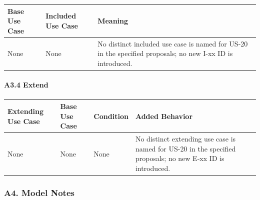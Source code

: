 \documentclass[12pt]{article}
\renewcommand{\baselinestretch}{1.5}
\begin{document}
\begingroup
\small
\renewcommand{\baselinestretch}{1.0}\selectfont
\renewcommand{\arraystretch}{1.15}
\setlength{\tabcolsep}{6pt}
\begin{longtable}{|>{\raggedright\arraybackslash}p{}|>{\raggedright\arraybackslash}p{}|>{\raggedright\arraybackslash}p{}|}
\hline
\textbf{Base Use Case} & \textbf{Included Use Case} & \textbf{Meaning} \\ \hline
\endhead
None & None & No distinct included use case is named for US-20 in the specified proposals; no new I-xx ID is introduced. \\ \hline
\end{longtable}
\endgroup
\par\medskip

\hypertarget{sec:a3-4-extend}{}
\paragraph*{A3.4 Extend}
\par\medskip

\begingroup
\small
\renewcommand{\baselinestretch}{1.0}\selectfont
\renewcommand{\arraystretch}{1.15}
\setlength{\tabcolsep}{6pt}
\begin{longtable}{|>{\raggedright\arraybackslash}p{}|>{\raggedright\arraybackslash}p{}|>{\raggedright\arraybackslash}p{}|>{\raggedright\arraybackslash}p{}|}
\hline
\textbf{Extending Use Case} & \textbf{Base Use Case} & \textbf{Condition} & \textbf{Added Behavior} \\ \hline
\endhead
None & None & None & No distinct extending use case is named for US-20 in the specified proposals; no new E-xx ID is introduced. \\ \hline
\end{longtable}
\endgroup
\par\medskip

\hypertarget{sec:a4-model-notes}{}
\subsubsection*{A4. Model Notes}
\par\medskip
\end{document}
